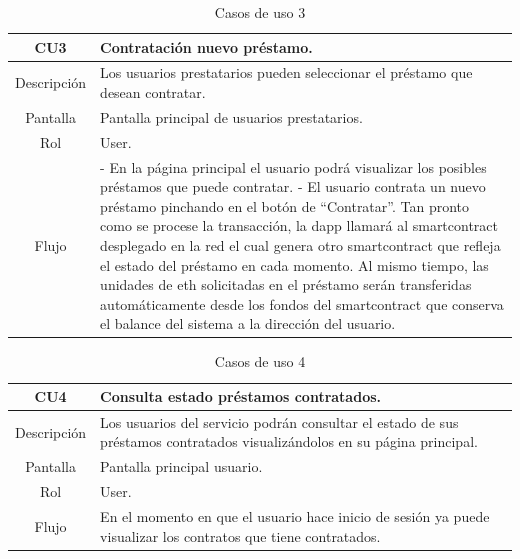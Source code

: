 \begin{table}[H]
\centering
\caption{Casos de uso 3}
\begin{tabular}{|c|p{12cm}|}
    \hline
    \rowcolor[HTML]{D0E7FF}
    CU3 & Contratación nuevo préstamo. \\ \hline
    Descripción   & Los usuarios prestatarios pueden seleccionar el préstamo que desean contratar.  \\ \hline
    Pantalla     & Pantalla principal de usuarios prestatarios.   \\ \hline
    Rol     & User. \\ \hline
    Flujo     &    - En la página principal el usuario podrá visualizar los posibles préstamos que
puede contratar. \newline
                   - El usuario contrata un nuevo préstamo pinchando en el botón de
\enquote{Contratar}. \newline
                                 Tan pronto como se procese la transacción, la \gls{dapp} llamará al \gls{smartcontract} desplegado en la red el cual genera otro \gls{smartcontract} que refleja el estado del préstamo en
cada momento. \newline
                                Al mismo tiempo, las unidades de \gls{eth} solicitadas en el préstamo serán transferidas
automáticamente desde los fondos del \gls{smartcontract} que conserva el balance del sistema a la dirección del
usuario.
                  \\ \hline
\end{tabular}
\end{table}

\begin{table}[H]
\centering
\caption{Casos de uso 4}
\begin{tabular}{|c|p{12cm}|}
    \hline
    \rowcolor[HTML]{D0E7FF}
    CU4 & Consulta estado préstamos contratados. \\ \hline
    Descripción   & Los usuarios del servicio podrán consultar el estado de sus préstamos contratados
visualizándolos en su página principal.  \\ \hline
    Pantalla     & Pantalla principal usuario.   \\ \hline
    Rol     & User. \\ \hline
    Flujo     &    En el momento en que el usuario hace inicio de sesión ya puede visualizar los contratos
que tiene contratados. \\ \hline
                 
\end{tabular}
\end{table}


